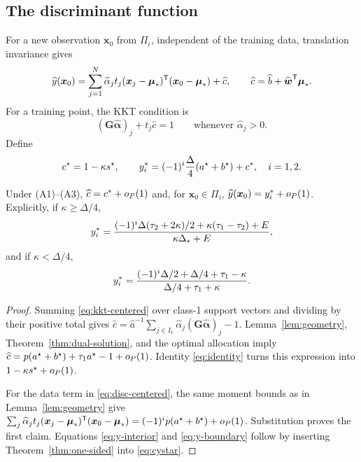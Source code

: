 \subsection{The discriminant function}
For a new observation $\boldsymbol x_0$ from $\Pi_i$, independent of the training data, translation invariance gives
\begin{equation}\label{eq:disc-centered}
\widehat y(\boldsymbol x_0)=
\sum_{j=1}^{N}\widehat\alpha_jt_j(\boldsymbol x_j-\boldsymbol\mu_*)^{\mathsf{T}}(\boldsymbol x_0-\boldsymbol\mu_*)+\widehat c,
\qquad
\widehat c=\widehat b+\widehat{\boldsymbol w}^{\mathsf{T}}\boldsymbol\mu_*.
\end{equation}
For a training point, the KKT condition is
\begin{equation}\label{eq:kkt-centered}
(\boldsymbol G\widehat{\boldsymbol\alpha})_j+t_j\widehat c=1
\qquad\text{whenever }\widehat\alpha_j>0.
\end{equation}
Define
\begin{equation}\label{eq:cystar}
c^*=1-\kappa s^{\star},
\qquad
y_i^*=(-1)^i{\Delta\over4}(a^{\star}+b^{\star})+c^*,\quad i=1,2.
\end{equation}

\begin{theorem}\label{thm:discriminant}
Under (A1)--(A3), $\widehat c=c^*+o_{P}(1)$ and, for $\boldsymbol x_0\in\Pi_i$,
$\widehat y(\boldsymbol x_0)=y_i^*+o_{P}(1)$. Explicitly, if $\kappa\ge\Delta/4$,
\begin{equation}\label{eq:y-interior}
y_i^*={(-1)^i\Delta(\tau_2+2\kappa)/2+\kappa(\tau_1-\tau_2)+E\over\kappa\Delta_*+E},
\end{equation}
and if $\kappa<\Delta/4$,
\begin{equation}\label{eq:y-boundary}
y_i^*={(-1)^i\Delta/2+\Delta/4+\tau_1-\kappa\over\Delta/4+\tau_1+\kappa}.
\end{equation}
\end{theorem}
\begin{proof}
Summing \eqref{eq:kkt-centered} over class-1 support vectors and dividing by their positive total gives
$\widehat c=\widehat a^{-1}\sum_{j\in I_1}\widehat\alpha_j(\boldsymbol G\widehat{\boldsymbol\alpha})_j-1$.
Lemma~\ref{lem:geometry}, Theorem~\ref{thm:dual-solution}, and the optimal allocation imply
$\widehat c=p(a^{\star}+b^{\star})+\tau_1a^{\star}-1+o_{P}(1)$.
Identity \eqref{eq:identity} turns this expression into $1-\kappa s^{\star}+o_{P}(1)$.

For the data term in \eqref{eq:disc-centered}, the same moment bounds as in Lemma~\ref{lem:geometry} give
$\sum_j\widehat\alpha_jt_j(\boldsymbol x_j-\boldsymbol\mu_*)^{\mathsf{T}}(\boldsymbol x_0-\boldsymbol\mu_*)=(-1)^ip(a^{\star}+b^{\star})+o_{P}(1)$.
Substitution proves the first claim. Equations \eqref{eq:y-interior} and \eqref{eq:y-boundary} follow by inserting Theorem~\ref{thm:one-sided} into \eqref{eq:cystar}.
\end{proof}


